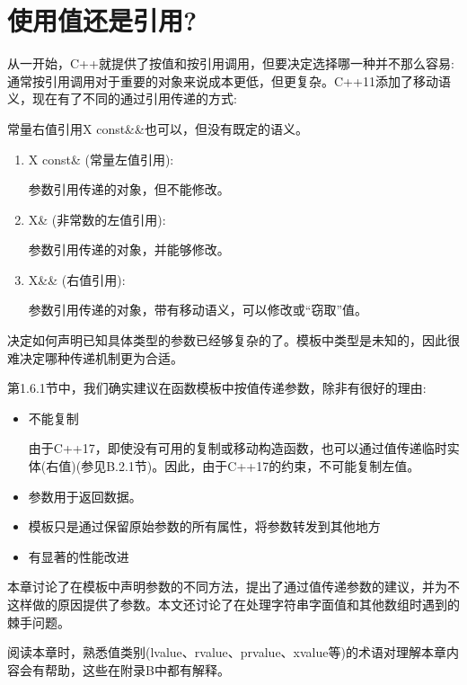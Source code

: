 \chapter{使用值还是引用?}
从一开始，C++就提供了按值和按引用调用，但要决定选择哪一种并不那么容易:通常按引用调用对于重要的对象来说成本更低，但更复杂。C++11添加了移动语义，现在有了不同的通过引用传递的方式:

\begin{notice}
常量右值引用X const\&\&也可以，但没有既定的语义。
\end{notice}

\begin{enumerate}
\item 
X const\& (常量左值引用):

参数引用传递的对象，但不能修改。

\item 
X\& (非常数的左值引用):

参数引用传递的对象，并能够修改。

\item 
X\&\& (右值引用):

参数引用传递的对象，带有移动语义，可以修改或“窃取”值。
\end{enumerate}

决定如何声明已知具体类型的参数已经够复杂的了。模板中类型是未知的，因此很难决定哪种传递机制更为合适。

第1.6.1节中，我们确实建议在函数模板中按值传递参数，除非有很好的理由:

\begin{itemize}
\item 
不能复制

\begin{notice}
由于C++17，即使没有可用的复制或移动构造函数，也可以通过值传递临时实体(右值)(参见B.2.1节)。因此，由于C++17的约束，不可能复制左值。
\end{notice}

\item 
参数用于返回数据。

\item 
模板只是通过保留原始参数的所有属性，将参数转发到其他地方

\item 
有显著的性能改进
\end{itemize}

本章讨论了在模板中声明参数的不同方法，提出了通过值传递参数的建议，并为不这样做的原因提供了参数。本文还讨论了在处理字符串字面值和其他数组时遇到的棘手问题。

阅读本章时，熟悉值类别(lvalue、rvalue、prvalue、xvalue等)的术语对理解本章内容会有帮助，这些在附录B中都有解释。




































